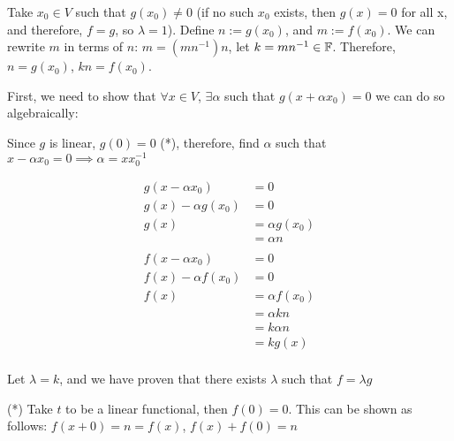 \documentclass[12pt]{article} %
\begin{document}
\begin{homeworkProblem}


    Take $x_0 \in V$ such that $g(x_0) \not = 0$ (if no such $x_0$ exists, then $g(x) = 0$ for all x, and therefore, $f = g$, so $\lambda = 1$). Define $n := g(x_0)$, and $m := f(x_0)$.
    We can rewrite $m$ in terms of $n$: $m = (mn^{-1}) n$, let $k = m n^{-1} \in \mathbb{F}$. Therefore, $n = g(x_0)$, $kn = f(x_0)$.

    First, we need to show that $\forall x \in V$, $\exists \alpha$ such that $g(x + \alpha x_0) = 0$ we can do so algebraically:

    Since $g$ is linear, $g(0) = 0$ (*), therefore, find $\alpha$ such that $x - \alpha x_0 = 0 \implies \alpha = x x_0^{-1}$

    \begin{align*}
        g(x - \alpha x_0)    & = 0             \\
        g(x) - \alpha g(x_0) & =  0            \\
        g(x)                 & = \alpha g(x_0) \\
                             & = \alpha n      \\ \\
        f(x - \alpha x_0)    & =0              \\
        f(x) - \alpha f(x_0) & =0              \\
        f(x)                 & = \alpha f(x_0) \\
                             & = \alpha kn     \\
                             & = k \alpha n    \\
                             & = k g(x)        \\
    \end{align*}

    Let $\lambda = k$, and we have proven that there exists $\lambda$ such that $f = \lambda g$


    (*) Take $t$ to be a linear functional, then $f(0) = 0$. This can be shown as follows: $f(x + 0) = n = f(x)$, $f(x) + f(0) = n$
\end{homeworkProblem}
\end{document}
